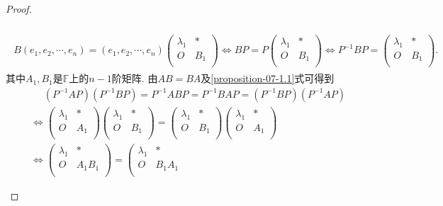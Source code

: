 \documentclass[../../main.tex]{subfiles}%
\begin{document}
\begin{proof}
\begin{enumerate}
\begin{align}
\begin{aligned}
\\
B\left( e_1,e_2,\cdots ,e_n \right) =\left( e_1,e_2,\cdots ,e_n \right) \left( \begin{matrix}
\lambda _1&		*\\
O&		B_1\\
\end{matrix} \right) \iff BP=P\left( \begin{matrix}
\lambda _1&		*\\
O&		B_1\\
\end{matrix} \right) \iff P^{-1}BP=\left( \begin{matrix}
\lambda _1&		*\\
O&		B_1\\
\end{matrix} \right) .
\end{aligned}
\end{align}
其中\(A_{1},B_{1}\)是\(\mathbb{F}\)上的\(n - 1\)阶矩阵. 由\(AB = BA\)及\eqref{proposition-07-1.1}式可得到
\begin{align*}
&\quad\,\, \left( P^{-1}AP \right) \left( P^{-1}BP \right) =P^{-1}ABP=P^{-1}BAP=\left( P^{-1}BP \right) \left( P^{-1}AP \right) 
\\
&\iff \left( \begin{matrix}
\lambda _1&		*\\
O&		A_1\\
\end{matrix} \right) \left( \begin{matrix}
\lambda _1&		*\\
O&		B_1\\
\end{matrix} \right) =\left( \begin{matrix}
\lambda _1&		*\\
O&		B_1\\
\end{matrix} \right) \left( \begin{matrix}
\lambda _1&		*\\
O&		A_1\\
\end{matrix} \right) 
\\
&\iff \left( \begin{matrix}
\lambda _1&		*\\
O&		A_1B_1\\
\end{matrix} \right) =\left( \begin{matrix}
\lambda _1&		*\\
O&		B_1A_1\\

\end{matrix}
\end{align*}
\end{enumerate}
\end{proof}
\end{document}
